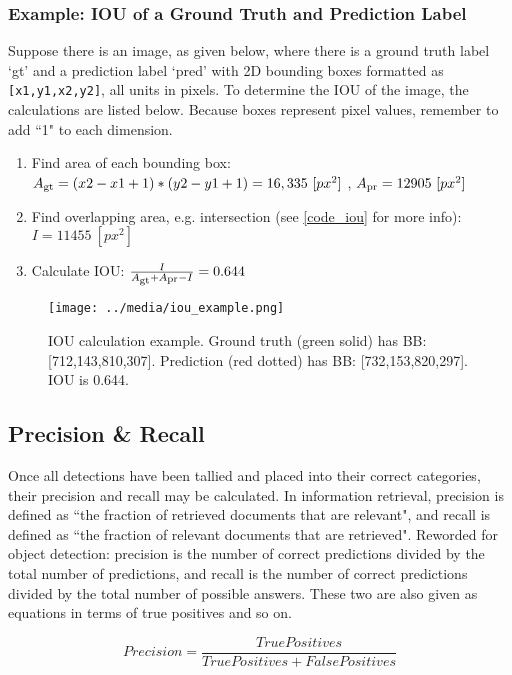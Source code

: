 \subsubsection{Example: IOU of a Ground Truth and Prediction Label}
Suppose there is an image, as given below, where there is a ground truth label `gt' and a prediction label `pred' with 2D bounding boxes formatted as \texttt{[x1,y1,x2,y2]}, all units in pixels. To determine the IOU of the image, the calculations are listed below. Because boxes represent pixel values, remember to add ``1" to each dimension.

\def \pxpx {\ [px^2]}
\def \Asub #1{A\textsubscript{#1}}
\begin{enumerate}\itemsep=-0.5em
    \item Find area of each bounding box: \\ $\Asub{gt} = (x2-x1+1)*(y2-y1+1) = 16,335 \pxpx $ , $ \Asub{pr} = 12905 \pxpx $
    \item Find overlapping area, e.g. intersection (see \ref{code_iou} for more info): $I = 11455 \pxpx $
    \item Calculate IOU: $\frac{I}{\Asub{gt} + \Asub{pr} - I} = 0.644 $
\end{enumerate}

\begin{figure}[ht]
    \centering
    \texttt{[image: ../media/iou\_example.png]}
    \caption{IOU calculation example. Ground truth (green solid) has BB: [712,143,810,307]. Prediction (red dotted) has BB: [732,153,820,297]. IOU is 0.644.}
    \label{iou_example}
\end{figure}


\subsection{Precision \& Recall}
Once all detections have been tallied and placed into their correct categories, their precision and recall may be calculated. In information retrieval, precision is defined as ``the fraction of retrieved documents that are relevant", and recall is defined as ``the fraction of relevant documents that are retrieved". Reworded for object detection: precision is the number of correct predictions divided by the total number of predictions, and recall is the number of correct predictions divided by the total number of possible answers. These two are also given as equations in terms of true positives and so on.

\begin{equation}
Precision = \frac{TruePositives}{TruePositives + FalsePositives}
\label{eq_prec}
\end{equation}

